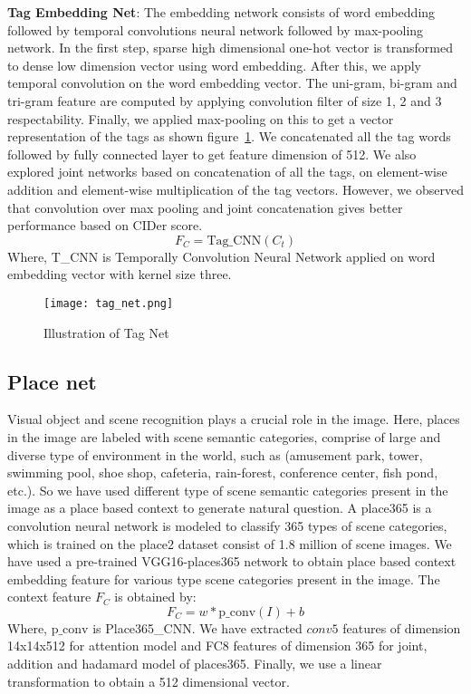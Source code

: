 \documentclass[11pt,a4paper]{article}
\begin{document}
\textbf{Tag Embedding Net}:
The embedding network consists of word embedding followed by temporal convolutions neural network followed by max-pooling network. In the first step, sparse high dimensional one-hot vector is transformed to dense low dimension vector using word embedding. After this, we apply temporal convolution on the word embedding vector. The uni-gram, bi-gram and tri-gram feature are computed by applying convolution filter of size 1, 2 and 3 respectability. Finally, we applied max-pooling on this to get a vector representation of the tags as shown figure~\ref{fig:tag}. We concatenated all the tag words followed by fully connected layer to get feature dimension of 512. We also explored joint networks based on concatenation of all the tags, on element-wise addition and element-wise multiplication of the tag vectors. However, we observed that convolution over max pooling and joint concatenation gives better performance based on CIDer score.
\[F_C =\text{Tag\_CNN}(C_t)\]
Where, T\_CNN is Temporally Convolution Neural Network applied on word embedding vector with kernel size three.

\begin{figure}[ht]
\centering
\texttt{[image: tag\_net.png]}
	\caption{ Illustration of Tag Net }
	\label{fig:tag}
\end{figure}


\subsection{Place net}
Visual object and scene recognition plays a crucial role in the image. Here, places in the image are  labeled with scene semantic categories\cite{Zhou_PAMI2017}, comprise of large and diverse type of environment in the world, such as (amusement park, tower, swimming pool, shoe shop, cafeteria, rain-forest, conference center, fish pond, etc.). So we have used different type of scene semantic categories present in the image as a place based context to generate natural question. A place365 is a convolution neural network is modeled to classify 365 types of scene categories, which is trained on the place2 dataset consist of 1.8 million of scene images. We have used a pre-trained VGG16-places365 network to obtain place based context embedding feature for  various type scene categories present in the image. The context feature $F_C$ is obtained by:
 \[F_C =w*\text{p\_conv}(I) +b \]
Where, $\text{p\_conv}$ is Place365\_CNN. We have extracted $conv5$ features of dimension 14x14x512 for attention model and FC8 features of dimension 365 for joint, addition and hadamard model of places365. Finally, we use a linear transformation to obtain a 512 dimensional vector.
 
\end{document}
